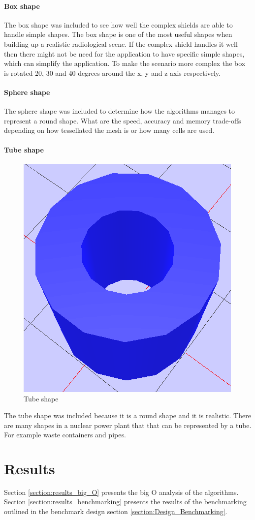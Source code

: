 \documentclass[11pt,twoside,a4paper]{report}
\begin{document}
\subsubsection{Box shape}
The box shape was included to see how well the complex shields are able to handle simple shapes. The box shape is one of the most useful shapes when building up a realistic radiological scene. If the complex shield handles it well then there might not be need for the application to have specific simple shapes, which can simplify the application. To make the scenario more complex the box is rotated 20, 30 and 40 degrees around the x, y and z axis respectively.

\subsubsection{Sphere shape}
The sphere shape was included to determine how the algorithms manages to represent a round shape. What are the speed, accuracy and memory trade-offs depending on how tessellated the mesh is or how many cells are used. 

\subsubsection{Tube shape}
\begin{figure}[h]
    \centering
    \includegraphics[width=0.45\linewidth]{images/tube_mesh}
    \caption{Tube shape}
    \label{fig:Tube shape}
\end{figure}

The tube shape was included because it is a round shape and it is realistic. There are many shapes in a nuclear power plant that that can be represented by a tube. For example waste containers and pipes.



\chapter{Results}
\label{chapter:Results}
Section \ref{section:results_big_O} presents the big O analysis of the algorithms. Section \ref{section:results_benchmarking} presents the results of the benchmarking outlined in the benchmark design section \ref{section:Design_Benchmarking}.
\end{document}
